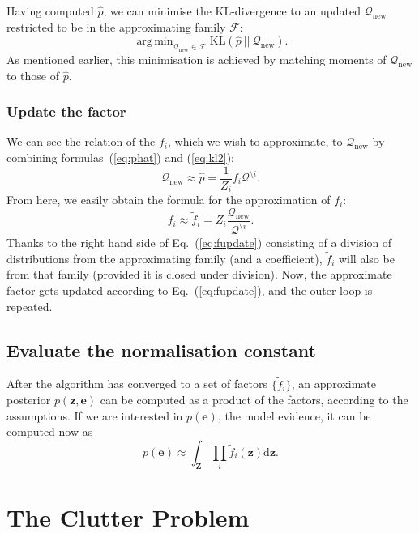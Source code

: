 \documentclass[11pt]{article}
\newcommand{\vek}[1]{\ensuremath{\mathbf{#1}}}
\newcommand{\kve}{\ensuremath{\mathcal{Q}}}
\newcommand{\byd}{\ensuremath{\mathrm{d}}}
\newcommand{\KL}[2]{\ensuremath{\text{KL}(#1\:||\:#2)}}
\DeclareMathOperator*{\argmin}{arg\,min}
\newcommand{\oldss}{\thesubsection}
\newcommand{\oldsss}{\thesubsubsection}
\begin{document}
Having computed $\hat{p}$, we can minimise the KL-divergence to an updated 
$\kve_{\text{new}}$ restricted to be in the approximating family 
$\mathcal{F}$:
\begin{equation}
	\argmin_{\kve_{\text{new}}\in\mathcal{F}}%
		\KL{\hat{p}}{\kve_{\text{new}}}.
	\label{eq:kl2}
\end{equation}
As mentioned earlier, this minimisation is achieved by matching moments of 
$\kve_{\text{new}}$ to those of $\hat{p}$.

\subsubsection{Update the factor}
We can see the relation of the $f_i$, which we wish to approximate, to 
$\kve_{\text{new}}$ by combining formulas~(\ref{eq:phat}) and 
(\ref{eq:kl2}):
\begin{equation}
	\kve_{\text{new}} \approx \hat{p} = \frac{1}{Z_i}f_i\kve^{\setminus i}.
\end{equation}
From here, we easily obtain the formula for the approximation of $f_i$:
\begin{equation}
	f_i \approx \tilde{f}_i = Z_i\frac{\kve_{\text{new}}}{\kve^{\setminus 
	i}}.
	\label{eq:fupdate}
\end{equation}
Thanks to the right hand side of Eq.~(\ref{eq:fupdate}) consisting of 
a division of distributions from the approximating family (and 
a coefficient), $\tilde{f}_i$ will also be from that family (provided it is 
closed under division).  Now, the approximate factor gets updated according 
to Eq.~(\ref{eq:fupdate}), and the outer loop is repeated.

\subsection{Evaluate the normalisation constant}
After the algorithm has converged to a set of factors $\{\tilde{f}_i\}$, an 
approximate posterior $p(\vek{z}, \vek{e})$ can be computed as a product of 
the factors, according to the assumptions. If we are interested in 
$p(\vek{e})$, the model evidence, it can be computed now as
\begin{equation}
	p(\vek{e}) \approx \int_{\vek{Z}} \prod_i\tilde{f}_i(\vek{z}) \byd\vek{z}.
	\label{eq:normaliser}
\end{equation}

\renewcommand{\thesubsection}{\oldss}
\renewcommand{\thesubsubsection}{\oldsss}

\section{The Clutter Problem}
\label{sec:clutter}
\end{document}
